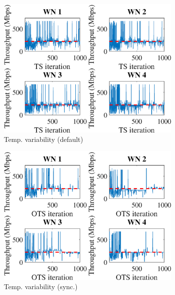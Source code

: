 \documentclass[preprint,12pt]{article}
\begin{document}
\begin{figure}[h!]
\begin{subfigure}[b]{.33\textwidth}
		\includegraphics[width=\textwidth]{images/temporal_individual_tpt_TS}
		\caption{Temp. variability  (default)}\label{fig:temporal_individual_tpt_TS}
	\end{subfigure}
	\begin{subfigure}[b]{.33\textwidth}
		\includegraphics[width=\textwidth]{images/temporal_individual_tpt_OTS}
		\caption{Temp. variability  (sync.)}\label{fig:temporal_individual_tpt_OTS}
	\end{subfigure}\\
	\begin{subfigure}[b]{.33\textwidth}

\end{subfigure}
\end{figure}
\end{document}
